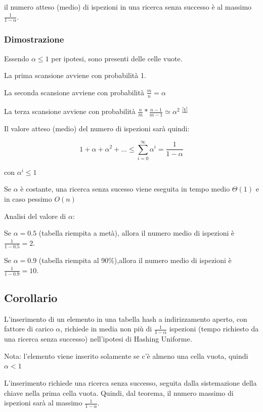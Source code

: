 \documentclass{article}
\begin{document}
{il numero atteso (medio) di ispezioni in una ricerca senza successo è al massimo $\frac{1}{1-\alpha}$.}

\subsubsection{Dimostrazione}

{Essendo $\alpha \leq 1$ per ipotesi, sono presenti delle celle vuote.}

{La prima scansione avviene con probabilità 1.}

{La seconda scansione avviene con probabilità $\frac{m}{n} = \alpha$}

{La terza scansione avviene con probabilità $\frac{n}{m} * \frac{n-1}{m-1} \simeq \alpha^2 $}
\textsuperscript{\protect\hyperlink{cmnt20}{{[}t{]}}}

{Il valore atteso (medio) del numero di ispezioni sarà quindi:}

\begin{equation}
1+\alpha+\alpha^2+\ldots \leq \sum_{i=0}^{\infty}{\alpha^i} = \frac{1}{1-\alpha}
\end{equation}

{con $\alpha^i\leq1$}

{Se $\alpha$ è costante, una ricerca senza sucesso viene eseguita in tempo medio $\Theta(1)$ e in caso pessimo $O(n)$}

{Analisi del valore di $\alpha$:}

{Se $\alpha=0.5$ (tabella riempita a metà), allora il numero medio di ispezioni è $\frac{1}{1-0.5}=2$.}

{Se $\alpha=0.9$ (tabella riempita al 90\%),allora il numero medio di ispezioni è $\frac{1}{1-0.9}=10$.}

\subsection{Corollario}

{L'inserimento di un elemento in una tabella hash a indirizzamento aperto, con fattore di carico $\alpha$, richiede in media non più di $\frac{1}{1-\alpha}$ ispezioni (tempo richiesto da una ricerca senza successo) nell'ipotesi di Hashing Uniforme.}

{Nota: l'elemento viene inserito solamente se c'è almeno una cella vuota, quindi $\alpha < 1$}

{L'inserimento richiede una ricerca senza successo, seguita dalla sistemazione della chiave nella prima cella vuota. Quindi, dal teorema, il numero massimo di ispezioni sarà al massimo $\frac{1}{1-\alpha}$.}
\end{document}
